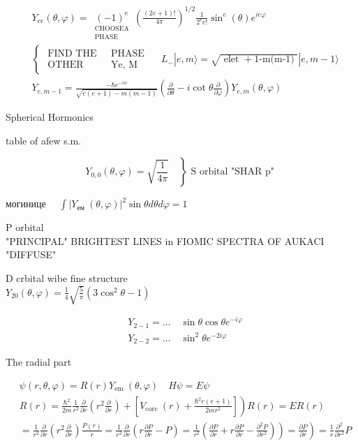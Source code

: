 \documentclass[10pt]{article}
\begin{document}
$$\begin{aligned}
& Y_{e e}(\theta, \varphi)=\underset{\substack{\text { CHOOSEA } \\
\text { PHASE }}}{(-1)^{e}}\left(\frac{(2 e+1)!}{4 \pi}\right)^{1 / 2} \frac{1}{2^{e} e!} \sin ^{e}(\theta) e^{i e \varphi} \\
& \left\{\begin{array}{ll}
\text { FIND THE } & \text { PHASE } \\
\text { OTHER } & \text { Ye, M }
\end{array} \quad L_{-}|e, m\rangle=\sqrt{\text { elet }+1 \text {-m(m-1) }}|e, m-1\rangle\right. \\
& Y_{e, m-1}=\frac{-\hbar e^{-i \phi}}{\sqrt{e(e+1)-m(m-1)}}\left(\frac{\partial}{\partial \theta}-i \cot \theta \frac{\partial}{\partial \varphi}\right) Y_{e, m}(\theta, \varphi)
\end{aligned}
$$

Spherical Hormonics

table of afew s.m.

$$
\left.Y_{0,0}(\theta, \varphi)=\sqrt{\frac{1}{4 \pi}} \quad\right\} \text { S orbital "SHAR p" }
$$

могинице $\quad \int\left|Y_{\text {ем }}(\theta, \varphi)\right|^{2} \sin \theta d \theta d \varphi=1$

P orbital\\
"PRINCIPAL" BRIGHTEST LINES in FIOMIC SPECTRA OF AUKACI "DIFFUSE"

D crbital wibe fine structure\\
$Y_{20}(\theta, \varphi)=\frac{1}{4} \sqrt{\frac{5}{\pi}}\left(3 \cos ^{2} \theta-1\right)$

$$
\begin{aligned}
& Y_{2-1}=\ldots \quad \sin \theta \cos \theta e^{-i \varphi} \\
& Y_{2-2}=\ldots \quad \sin ^{2} \theta e^{-2 i \varphi}
\end{aligned}
$$

The radial part

$$
\begin{aligned}
& \psi(r, \theta, \varphi)=R(r) Y_{\text {em }}(\theta, \varphi) \quad H \psi=E \psi \\
& \left.R(r)=\frac{\hbar^{2}}{2 m} \frac{1}{r^{2}} \frac{\partial}{\partial r}\left(r^{2} \frac{\partial}{\partial r}\right)+\left[V_{\text {core }}(r)+\frac{\hbar^{2} e(e+1)}{2 m r^{2}}\right]\right) R(r)=E R(r) \\
& \left.\left.=\frac{1}{r^{2}} \frac{\partial}{\partial r}\left(r^{2} \frac{\partial}{\partial r}\right) \frac{P(r)}{r}=\frac{1}{r^{2}} \frac{\partial}{\partial r}\left(r \frac{\partial P}{\partial r}-P\right)=\frac{1}{r^{2}}\left(\frac{\partial P}{\partial r}+r \frac{\partial P}{\partial r}-\frac{\partial^{2} P}{\partial r^{2}}\right)\right)=\frac{\partial P}{\partial r}\right)=\frac{1}{r} \frac{\partial^{2}}{\partial r^{2}} P
\end{aligned}
$$
\end{document}
